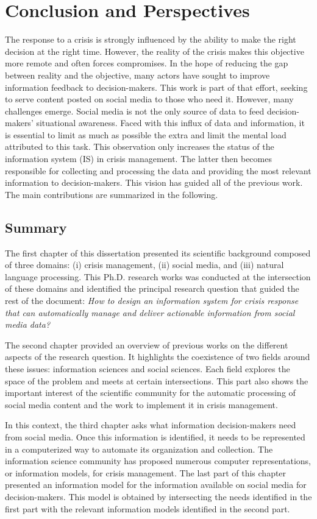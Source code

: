 \chapter*{Conclusion and Perspectives}

The response to a crisis is strongly influenced by the ability to make the right decision at the right time.
However, the reality of the crisis makes this objective more remote and often forces compromises.
In the hope of reducing the gap between reality and the objective, many actors have sought to improve information feedback to decision-makers.
This work is part of that effort, seeking to serve content posted on social media to those who need it.
However, many challenges emerge.
Social media is not the only source of data to feed decision-makers' situational awareness.
Faced with this influx of data and information, it is essential to limit as much as possible the extra and limit the mental load attributed to this task.
This observation only increases the status of the information system (IS) in crisis management.
The latter then becomes responsible for collecting and processing the data and providing the most relevant information to decision-makers.
This vision has guided all of the previous work.
The main contributions are summarized in the following.

\section*{Summary}
The first chapter of this dissertation presented its scientific background composed of three domains: (i) crisis management, (ii) social media, and (iii) natural language processing.
This Ph.D. research works was conducted at the intersection of these domains and identified the principal research question that guided the rest of the document: \emph{How to design an information system for crisis response that can automatically manage and deliver actionable information from social media data?}

The second chapter provided an overview of previous works on the different aspects of the research question.
It highlights the coexistence of two fields around these issues: information sciences and social sciences.
Each field explores the space of the problem and meets at certain intersections.
This part also shows the important interest of the scientific community for the automatic processing of social media content and the work to implement it in crisis management.

In this context, the third chapter asks what information decision-makers need from social media.
Once this information is identified, it needs to be represented in a computerized way to automate its organization and collection.
The information science community has proposed numerous computer representations, or information models, for crisis management.
The last part of this chapter presented an information model for the information available on social media for decision-makers.
This model is obtained by intersecting the needs identified in the first part with the relevant information models identified in the second part.


